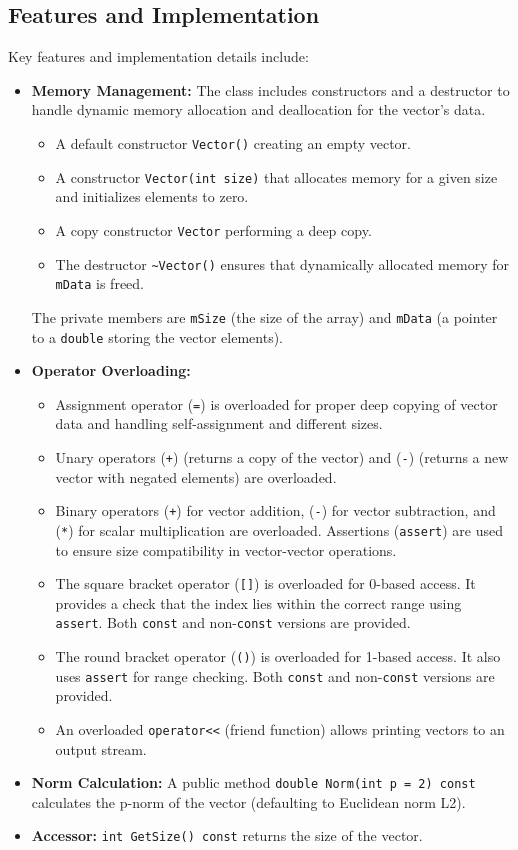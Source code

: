 \subsection{Features and Implementation}
Key features and implementation details include:
\begin{itemize}
    \item \textbf{Memory Management:} The class includes constructors and a destructor to handle dynamic memory allocation and deallocation for the vector's data.
        \begin{itemize}
            \item A default constructor \texttt{Vector()} creating an empty vector.
            \item A constructor \texttt{Vector(int size)} that allocates memory for a given size and initializes elements to zero.
            \item A copy constructor \texttt{Vector} performing a deep copy.
            \item The destructor \texttt{\textasciitilde Vector()} ensures that dynamically allocated memory for \texttt{mData} is freed.
        \end{itemize}
    The private members are \texttt{mSize} (the size of the array) and \texttt{mData} (a pointer to a \texttt{double} storing the vector elements).

    \item \textbf{Operator Overloading:}
    \begin{itemize}
        \item Assignment operator (\texttt{=}) is overloaded for proper deep copying of vector data and handling self-assignment and different sizes.
        \item Unary operators (\texttt{+}) (returns a copy of the vector) and (\texttt{-}) (returns a new vector with negated elements) are overloaded.
        \item Binary operators (\texttt{+}) for vector addition, (\texttt{-}) for vector subtraction, and (\texttt{*}) for scalar multiplication are overloaded. Assertions (\texttt{assert}) are used to ensure size compatibility in vector-vector operations.
        \item The square bracket operator (\texttt{[]}) is overloaded for 0-based access. It provides a check that the index lies within the correct range using \texttt{assert}. Both \texttt{const} and non-\texttt{const} versions are provided.
        \item The round bracket operator (\texttt{()}) is overloaded for 1-based access. It also uses \texttt{assert} for range checking. Both \texttt{const} and non-\texttt{const} versions are provided.
        \item An overloaded \texttt{operator<<} (friend function) allows printing vectors to an output stream.
    \end{itemize}
    \item \textbf{Norm Calculation:} A public method \texttt{double Norm(int p = 2) const} calculates the p-norm of the vector (defaulting to Euclidean norm L2).
    \item \textbf{Accessor:} \texttt{int GetSize() const} returns the size of the vector.
\end{itemize}

